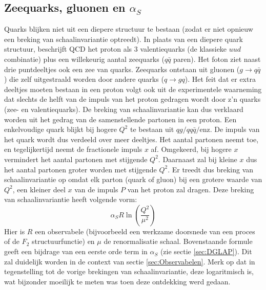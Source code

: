 \documentclass[a4paper,11pt]{article}
\numberwithin{equation}{section} %
\begin{document}
  \subsection{Zeequarks, gluonen en $\alpha_S$}
Quarks blijken niet uit een diepere structuur te bestaan (zodat er niet opnieuw een breking van schaalinvariantie optreedt).
In plaats van een diepere quark structuur, beschrijft QCD het proton als 3 valentiequarks (de klassieke $u u d$ combinatie) plus een willekeurig aantal zeequarks ($q\bar{q}$ paren).
Het foton ziet naast drie puntdeeltjes ook een zee van quarks.
Zeequarks ontstaan uit gluonen ($g\rightarrow q\bar{q}$) die zelf uitgestraald worden door andere quarks ($q\rightarrow gq$).
Het feit dat er extra deeltjes moeten bestaan in een proton volgt ook uit de experimentele waarneming dat slechts de helft van de impuls van het proton gedragen wordt door z’n quarks (zee- en valentiequarks).
De breking van schaalinvariantie kan dus verklaard worden uit het gedrag van de samenstellende partonen in een proton.
Een enkelvoudige quark blijkt bij hogere $Q^2$ te bestaan uit $q g/q q\bar{q}/$enz.
De impuls van het quark wordt dus verdeeld over meer deeltjes.
Het aantal partonen neemt toe, en tegelijkertijd neemt de fractionele impuls $x$ af.
Omgekeerd, bij hogere $x$ vermindert het aantal partonen met stijgende $Q^2$.
Daarnaast zal bij kleine $x$ dus het aantal partonen groter worden met stijgende $Q^2$.
Er treedt dus breking van schaalinvariantie op omdat elk parton (quark of gluon) bij een grotere waarde van $Q^2$, een kleiner deel  $x$ van de impuls $P$ van het proton zal dragen.
Deze breking van schaalinvariantie heeft volgende vorm:
\begin{equation}
\alpha_S R \ln{\left( \frac{Q^2}{\mu^2}\right)}
\end{equation}
Hier is $R$ een observabele (bijvoorbeeld een werkzame doorsnede van een proces of de $F_2$ structuurfunctie) en $\mu$ de renormalisatie schaal.
Bovenstaande formule geeft een bijdrage van een eerste orde term in $\alpha_S$ (zie sectie \ref{sec:DGLAP}).
Dit zal duidelijk worden in de context van sectie \ref{sec:Observabelen}.
Merk op dat in tegenstelling tot de vorige brekingen van schaalinvariantie, deze logaritmisch is, wat bijzonder moeilijk te meten was toen deze ontdekking werd gedaan.
\end{document}
